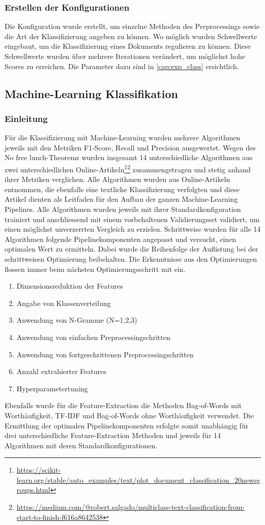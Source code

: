 \subsubsection{Erstellen der Konfigurationen}
Die Konfiguration wurde erstellt, um einzelne Methoden des Preprocessings sowie die Art der Klassifizierung angeben zu können.
Wo möglich wurden Schwellwerte eingebaut, um die Klassifizierung eines Dokuments regulieren zu können.
Diese Schwellwerte wurden über mehrere Iterationen verändert, um möglichst hohe Scores zu erreichen.
Die Parameter dazu sind in \cref{cap:exp_class} ersichtlich.
\subsection{Machine-Learning Klassifikation}
\subsubsection{Einleitung}
Für die Klassifizierung mit Machine-Learning wurden mehrere Algorithmen jeweils mit den Metriken F1-Score, Recall und Precision ausgewertet.
Wegen des \glqq No free lunch\grqq{}-Theorems wurden insgesamt 14 unterschiedliche Algorithmen aus zwei unterschiedlichen Online-Artikeln\footnote{\url{https://scikit-learn.org/stable/auto_examples/text/plot_document_classification_20newsgroups.html}}\footnote{\url{https://medium.com/@robert.salgado/multiclass-text-classification-from-start-to-finish-f616a8642538}} zusammengetragen und stetig anhand ihrer Metriken verglichen.
Alle Algorithmen wurden aus Online-Artikeln entnommen, die ebenfalls eine textliche Klassifizierung verfolgten und diese Artikel dienten als Leitfaden für den Aufbau der ganzen Machine-Learning Pipelines.
Alle Algorithmen wurden jeweils mit ihrer Standardkonfiguration trainiert und anschliessend mit einem vorbehaltenen Validierungsset validiert, um einen möglichst unverzerrten Vergleich zu erzielen.
Schrittweise wurden für alle 14 Algorithmen folgende Pipelinekomponenten angepasst und versucht, einen optimalen Wert zu ermitteln.
Dabei wurde die Reihenfolge der Auflistung bei der schrittweisen Optimierung beibehalten.
Die Erkenntnisse aus den Optimierungen flossen immer beim nächsten Optimierungsschritt mit ein.
\begin{enumerate}
	\item Dimensionsreduktion der Features 
	\item Angabe von Klassenverteilung
	\item Anwendung von N-Gramme (N={1,2,3})
	\item Anwendung von einfachen Preprocessingschritten
	\item Anwendung von fortgeschrittenen Preprocessingschritten
	\item Anzahl extrahierter Features
	\item Hyperparametertuning
\end{enumerate}
Ebenfalls wurde für die Feature-Extraction die Methoden Bag-of-Words mit Worthäufigkeit, TF-IDF und Bag-of-Words ohne Worthäufigkeit verwendet.
Die Ermittlung der optimalen Pipelinekomponenten erfolgte somit unabhängig für drei unterschiedliche Feature-Extraction Methoden und jeweils für 14 Algorithmen mit deren Standardkonfigurationen.
